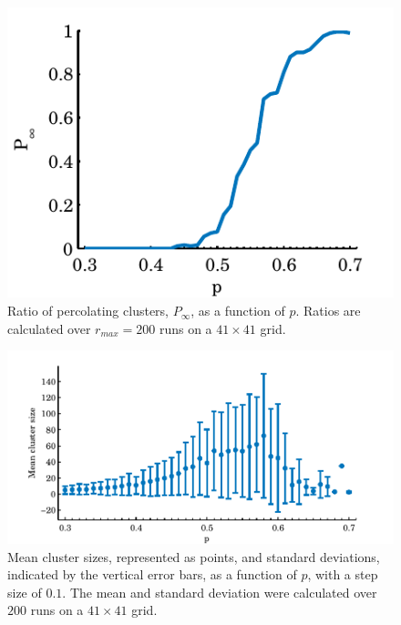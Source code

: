 \begin{figure}
	\centering
	\includegraphics[width=\columnwidth]{./img/assignment_a_p_infinite_ratio_p.pdf}
	\caption{Ratio of percolating clusters, $P_\infty$, as a function of $p$. Ratios are calculated over $r_{max} = 200$ runs on a $41 \times 41$ grid.}
	\label{fig:experiment:prob:p_inf_ratio}
\end{figure}


\begin{figure}
	\centering
	\includegraphics[width=\textwidth]{./img/assignment_a_mean_std_p.pdf}
	\caption{Mean cluster sizes, represented as points, and standard deviations, indicated by the vertical error bars, as a function of $p$, with a step size of $0.1$. The mean and standard deviation were calculated over $200$ runs on a $41 \times 41$ grid.}
	\label{fig:experiment:prob:mean_std_clusters}
\end{figure}

